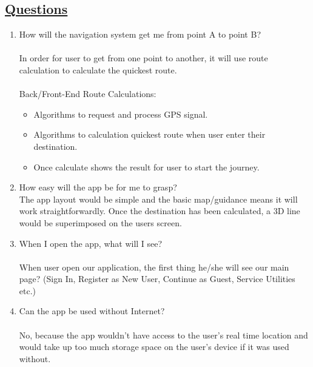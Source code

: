 \subsection*{\underline{Questions}}
\begin{enumerate}
    \item How will the navigation system get me from point A to point B?\\\\
    In order for user to get from one point to another, it will use route calculation to calculate the quickest route.\\\\
    Back/Front-End Route Calculations:
    \begin{itemize}
        \item Algorithms to request and process GPS signal.
        \item Algorithms to calculation quickest route when user enter their destination.
        \item Once calculate shows the result for user to start the journey.
    \end{itemize}
    
    \item How easy will the app be for me to grasp? \\
    
    The app layout would be simple and the basic map/guidance means it will work straightforwardly. Once the destination has been calculated, a 3D line would be superimposed on the users screen.
    
    \item When I open the app, what will I see?\\\\
    When user open our application, the first thing he/she will see our main page? (Sign In, Register as New User, Continue as Guest, Service Utilities etc.)
    
    \item Can the app be used without Internet?\\\\
    No, because the app wouldn't have access to the user's real time location and would take up too much storage space on the user's device if it was used without.
\end{enumerate}
